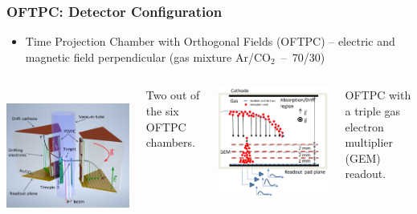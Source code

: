 \documentclass{beamer}
\begin{document}
	\begin{frame}
		\frametitle{OFTPC: Detector Configuration}
		\begin{itemize}
			\item Time Projection Chamber with Orthogonal Fields (OFTPC) -- electric and magnetic field perpendicular (gas mixture Ar/CO$_2$~--~70/30)
		\end{itemize}
		\begin{columns}
				\centering
				\begin{minipage}[t][4.05cm]{\textwidth}
					\centering
					\textcolor{white}{a\,\,}\includegraphics[width=0.82\linewidth]{../images/diagram.png}\newline
				\end{minipage}
				Two out of the six OFTPC chambers.~\cite{poster}
				\centering
				\begin{minipage}[t][4.05cm]{\textwidth}
					\centering
					\includegraphics[width=0.71\linewidth]{../images/diagram2.png}\newline
				\end{minipage}
				OFTPC with a triple gas electron multiplier (GEM) readout.~\cite{poster}
		\end{columns}
	\end{frame}
\end{document}
